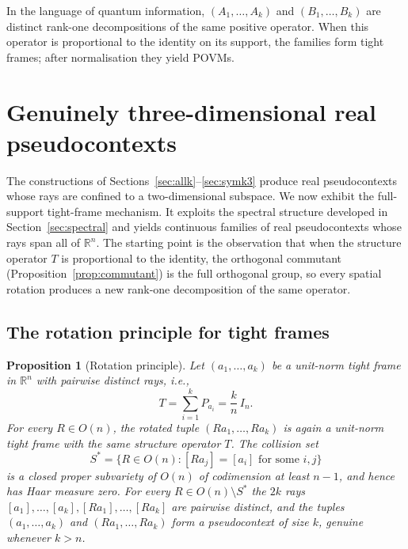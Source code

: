 \documentclass[
  twocolumn,
  aps,
  pra,
  floatfix,
  amsmath,amssymb,
  longbibliography
]{revtex4-2}
\newtheorem{proposition}[theorem]{Proposition}
\theoremstyle{definition}
\theoremstyle{remark}
\begin{document}
In the language of quantum information, $(A_1,\ldots,A_k)$ and
$(B_1,\ldots,B_k)$ are distinct rank-one decompositions of the same
positive operator.  When this operator is proportional to the identity
on its support, the families form tight frames; after normalisation
they yield POVMs.

\section{Genuinely three-dimensional real pseudocontexts}
\label{sec:3d_real}

The constructions of Sections~\ref{sec:allk}--\ref{sec:symk3} produce
real pseudocontexts whose rays are confined to a two-dimensional
subspace.  We now exhibit the full-support tight-frame mechanism.  It exploits the spectral
structure developed in Section~\ref{sec:spectral} and yields continuous
families of real pseudocontexts whose rays span all of $\mathbb{R}^n$.
The starting point is the observation that when the structure operator
$T$ is proportional to the identity, the orthogonal commutant
(Proposition~\ref{prop:commutant}) is the full orthogonal group, so every
spatial rotation produces a new rank-one decomposition of the same
operator.

\subsection{The rotation principle for tight frames}

\begin{proposition}[Rotation principle]\label{prop:rot_principle}
Let $(a_1,\ldots,a_k)$ be a unit-norm tight frame in $\mathbb{R}^n$ with pairwise distinct rays,
i.e.,
\[
  T=\sum_{i=1}^{k}P_{a_i}=\frac{k}{n}\,I_n.
\]
For every $R\in O(n)$, the rotated tuple $(Ra_1,\ldots,Ra_k)$ is
again a unit-norm tight frame with the same structure operator $T$.
The collision set
\[
  S^{*}=\bigl\{R\in O(n):[Ra_j]=[a_i]\text{ for some }i,j\bigr\}
\]
is a closed proper subvariety of $O(n)$ of codimension at least
$n-1$, and hence has Haar measure zero.  For every
$R\in O(n)\setminus S^{*}$ the $2k$ rays
$[a_1],\ldots,[a_k],[Ra_1],\ldots,[Ra_k]$ are pairwise distinct, and
the tuples $(a_1,\ldots,a_k)$ and $(Ra_1,\ldots,Ra_k)$ form a
pseudocontext of size $k$, genuine whenever $k>n$.
\end{proposition}
\end{document}
